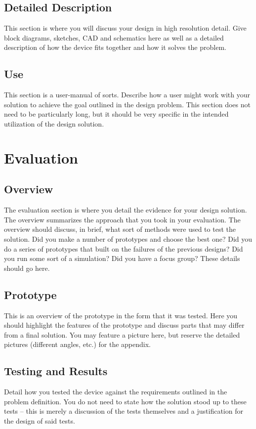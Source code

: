 \documentclass[journal]{IEEEtran}
\begin{document}
\subsection{Detailed Description}
This section is where you will discuss your design in high resolution detail. Give block diagrams, sketches, 
CAD and schematics here as well as a detailed description of how the device fits together and how it solves
the problem. 

\subsection{Use}
This section is a user-manual of sorts. Describe how a user might work with your solution to achieve the goal
outlined in the design problem. This section does not need to be particularly long, but it should be very 
specific in the intended utilization of the design solution.

\section{Evaluation}

\subsection{Overview}
The evaluation section is where you detail the evidence for your design solution. The overview summarizes the 
approach that you took in your evaluation. The overview should discuss, in brief, what sort of methods were
used to test the solution. Did you make a number of prototypes and choose the best one? Did you do a 
series of prototypes that built on the failures of the previous designs? Did you run some sort of a simulation?
Did you have a focus group? These details should go here. 

\subsection{Prototype}
This is an overview of the prototype in the form that it was tested. Here you should highlight the features of
the prototype and discuss parts that may differ from a final solution. You may feature a picture here, but reserve
the detailed pictures (different angles, etc.) for the appendix. 

\subsection{Testing and Results}
Detail how you tested the device against the requirements outlined in the problem definition. You do not 
need to state how the solution stood up to these tests -- this is merely a discussion of the tests themselves 
and a justification for the design of said tests. 
\end{document}
